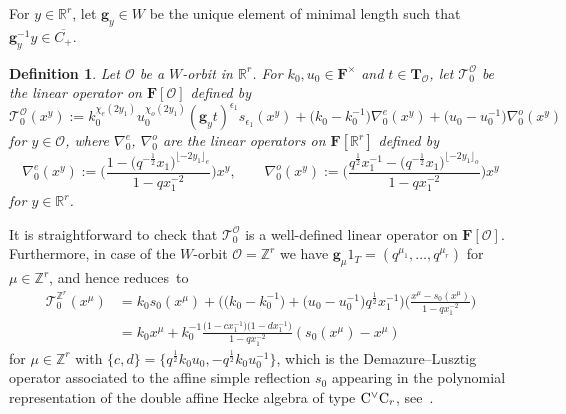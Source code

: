 \documentclass[pdftex]{sigma}
\numberwithin{equation}{section}
\newtheorem{Definition}[Theorem]{Definition}
\begin{document}
{For $y\in\mathbb{R}^r$, let $\mathbf{g}_y\in W$ be the unique element of minimal length such that $\mathbf{g}_y^{-1}y\in\overline{C_+}$.

\begin{Definition}%
Let $\mathcal{O}$ be a $W$-orbit in $\mathbb{R}^r$. For $k_0, u_0\in\mathbf{F}^\times$ and $t\in\mathbf{T}_\mathcal{O}$, let $\mathcal{T}_0^\mathcal{O}$ be the linear operator on $\mathbf{F}[\mathcal{O}]$ defined by
\begin{equation*}
\mathcal{T}_0^\mathcal{O}(x^y):=k_0^{\chi_e(2y_1)}u_0^{\chi_o(2y_1)}(\mathbf{g}_yt)^{\epsilon_1}s_{\epsilon_1}(x^y)+\bigl(k_0-k_0^{-1}\bigr)\nabla_0^e(x^y)+\bigl(u_0-u_0^{-1}\bigr)\nabla_0^o(x^y)
\end{equation*}
for $y\in \mathcal{O}$, where $\nabla_0^e$, $\nabla_0^o$ are the linear operators on $\mathbf{F}[\mathbb{R}^r]$ defined by
\begin{equation*}
\nabla_0^e(x^y):=\biggl(\frac{1-\bigl(q^{-\frac{1}{2}}x_1\bigr)^{\lfloor -2y_1\rfloor_e}}{1-qx_1^{-2}}\biggr)x^y,\qquad
\nabla_0^o(x^y):=\biggl(\frac{q^{\frac{1}{2}}x_1^{-1}-\bigl(q^{-\frac{1}{2}}x_1\bigr)^{\lfloor -2y_1\rfloor_o}}{1-qx_1^{-2}}\biggr)x^y
\end{equation*}
for $y\in\mathbb{R}^r$.
\end{Definition}

It is straightforward to check that $\mathcal{T}_0^{\mathcal{O}}$ is a well-defined linear operator on $\mathbf{F}[\mathcal{O}]$. Furthermore, in case of the $W$-orbit $\mathcal{O}=\mathbb{Z}^r$ we have $\mathbf{g}_\mu 1_T=(q^{\mu_1},\dots,q^{\mu_r})$ for $\mu\in\mathbb{Z}^r$, and hence  reduces~to
\begin{align}
\mathcal{T}_0^{\mathbb{Z}^r}(x^\mu)&=k_0s_0(x^\mu)+\bigl(\bigl(k_0-k_0^{-1}\bigr)+\bigl(u_0-u_0^{-1}\bigr)q^{\frac{1}{2}}x_1^{-1}\bigr)\biggl(\frac{x^\mu-s_0(x^\mu)}{1-qx_1^{-2}}\biggr)\nonumber\\
&=k_0x^\mu+k_0^{-1}\frac{\bigl(1-cx_1^{-1}\bigr)\bigl(1-dx_1^{-1}\bigr)}{1-qx_1^{-2}}(s_0(x^\mu)-x^\mu)\label{T0Zr}
\end{align}
for $\mu\in\mathbb{Z}^r$ with $\{c,d\}=\bigl\{q^{\frac{1}{2}}k_0u_0,-q^{\frac{1}{2}}k_0u_0^{-1}\bigr\}$, which is the Demazure--Lusztig operator associated to the affine simple reflection $s_0$ appearing in the polynomial representation of the double affine Hecke algebra of type ${\rm C}^\vee{\rm C}_r$, see~\cite{No,Sa}.

}
\end{document}
